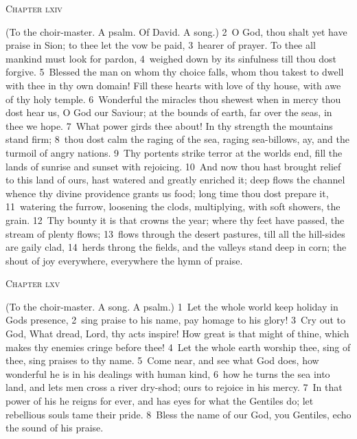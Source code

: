 \documentclass[10pt]{book} %
\begin{document}
\begin{large}\begin{center}\textsc{Chapter lxiv}\end{center}\end{large}
(To the choir-master. A psalm. Of David. A song.)
\textcolor{benred8}{2}~O God, thou shalt yet have praise in Sion; to thee let the vow be paid, \textcolor{benred8}{3}~hearer of prayer. To thee all mankind must look for pardon, \textcolor{benred8}{4}~weighed down by its sinfulness till thou dost forgive. \textcolor{benred8}{5}~Blessed the man on whom thy choice falls, whom thou takest to dwell with thee in thy own domain! Fill these hearts with love of thy house, with awe of thy holy temple. \textcolor{benred8}{6}~Wonderful the miracles thou shewest when in mercy thou dost hear us, O God our Saviour; at the bounds of earth, far over the seas, in thee we hope. \textcolor{benred8}{7}~What power girds thee about! In thy strength the mountains stand firm; \textcolor{benred8}{8}~thou dost calm the raging of the sea, raging sea-billows, ay, and the turmoil of angry nations. \textcolor{benred8}{9}~Thy portents strike terror at the world\textquotesingle s end, fill the lands of sunrise and sunset with rejoicing. \textcolor{benred8}{10}~And now thou hast brought relief to this land of ours, hast watered and greatly enriched it; deep flows the channel whence thy divine providence grants us food; long time thou dost prepare it, \textcolor{benred8}{11}~watering the furrow, loosening the clods, multiplying, with soft showers, the grain. \textcolor{benred8}{12}~Thy bounty it is that crowns the year; where thy feet have passed, the stream of plenty flows; \textcolor{benred8}{13}~flows through the desert pastures, till all the hill-sides are gaily clad, \textcolor{benred8}{14}~herds throng the fields, and the valleys stand deep in corn; the shout of joy everywhere, everywhere the hymn of praise.
\begin{large}\begin{center}\textsc{Chapter lxv}\end{center}\end{large}
(To the choir-master. A song. A psalm.)
\textcolor{benred8}{1}~Let the whole world keep holiday in God\textquotesingle s presence, \textcolor{benred8}{2}~sing praise to his name, pay homage to his glory! \textcolor{benred8}{3}~Cry out to God, What dread, Lord, thy acts inspire! How great is that might of thine, which makes thy enemies cringe before thee! \textcolor{benred8}{4}~Let the whole earth worship thee, sing of thee, sing praises to thy name. \textcolor{benred8}{5}~Come near, and see what God does, how wonderful he is in his dealings with human kind, \textcolor{benred8}{6}~how he turns the sea into land, and lets men cross a river dry-shod; ours to rejoice in his mercy. \textcolor{benred8}{7}~In that power of his he reigns for ever, and has eyes for what the Gentiles do; let rebellious souls tame their pride. \textcolor{benred8}{8}~Bless the name of our God, you Gentiles, echo the sound of his praise.
\end{document}
